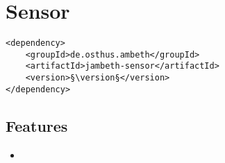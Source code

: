\section{Sensor}
\label{module:Sensor}
\ClearAPI
\TODO
\begin{lstlisting}[style=POM,caption={Maven modules to use \emph{Ambeth Sensor}}]
<dependency>
	<groupId>de.osthus.ambeth</groupId>
	<artifactId>jambeth-sensor</artifactId>
	<version>§\version§</version>
</dependency>
\end{lstlisting}
\subsection{Features}
\begin{itemize}
	\item \TODO
\end{itemize}

